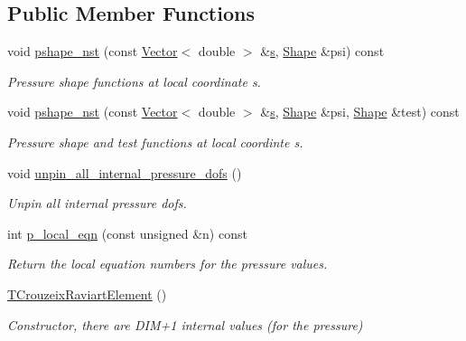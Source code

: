 \subsection*{Public Member Functions}
\begin{DoxyCompactItemize}
\item 
void \hyperlink{classoomph_1_1TCrouzeixRaviartElement_aed5a8e922aff987b4edcad608732be2b}{pshape\+\_\+nst} (const \hyperlink{classoomph_1_1Vector}{Vector}$<$ double $>$ \&\hyperlink{cfortran_8h_ab7123126e4885ef647dd9c6e3807a21c}{s}, \hyperlink{classoomph_1_1Shape}{Shape} \&psi) const
\begin{DoxyCompactList}\small\item\em Pressure shape functions at local coordinate s. \end{DoxyCompactList}\item 
void \hyperlink{classoomph_1_1TCrouzeixRaviartElement_ae9eed6d89a009cced2b3ab8838215cdf}{pshape\+\_\+nst} (const \hyperlink{classoomph_1_1Vector}{Vector}$<$ double $>$ \&\hyperlink{cfortran_8h_ab7123126e4885ef647dd9c6e3807a21c}{s}, \hyperlink{classoomph_1_1Shape}{Shape} \&psi, \hyperlink{classoomph_1_1Shape}{Shape} \&test) const
\begin{DoxyCompactList}\small\item\em Pressure shape and test functions at local coordinte s. \end{DoxyCompactList}\item 
void \hyperlink{classoomph_1_1TCrouzeixRaviartElement_acf0a40b1110f0761c405a92658204f8c}{unpin\+\_\+all\+\_\+internal\+\_\+pressure\+\_\+dofs} ()
\begin{DoxyCompactList}\small\item\em Unpin all internal pressure dofs. \end{DoxyCompactList}\item 
int \hyperlink{classoomph_1_1TCrouzeixRaviartElement_abe36d468c62f8098a62d74be8dd553b3}{p\+\_\+local\+\_\+eqn} (const unsigned \&n) const
\begin{DoxyCompactList}\small\item\em Return the local equation numbers for the pressure values. \end{DoxyCompactList}\item 
\hyperlink{classoomph_1_1TCrouzeixRaviartElement_a5b536954f604a69530cfa3de45a654fd}{T\+Crouzeix\+Raviart\+Element} ()
\begin{DoxyCompactList}\small\item\em Constructor, there are D\+I\+M+1 internal values (for the pressure) \end{DoxyCompactList}\item 

\end{DoxyCompactItemize}
